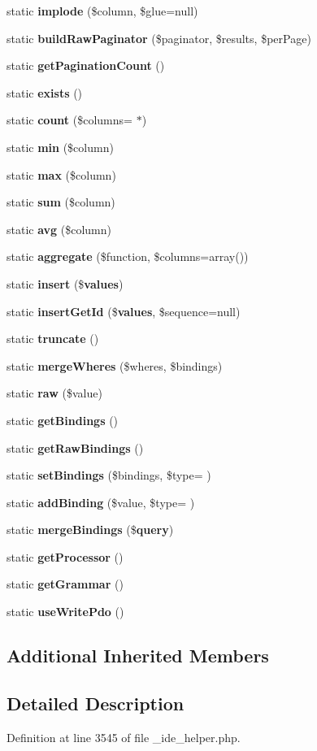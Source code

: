 \begin{DoxyCompactItemize}
static {\bf implode} (\$column, \$glue=null)
\item 
static {\bf build\+Raw\+Paginator} (\$paginator, \$results, \$per\+Page)
\item 
static {\bf get\+Pagination\+Count} ()
\item 
static {\bf exists} ()
\item 
static {\bf count} (\$columns= \textquotesingle{}$\ast$\textquotesingle{})
\item 
static {\bf min} (\$column)
\item 
static {\bf max} (\$column)
\item 
static {\bf sum} (\$column)
\item 
static {\bf avg} (\$column)
\item 
static {\bf aggregate} (\$function, \$columns=array())
\item 
static {\bf insert} (\${\bf values})
\item 
static {\bf insert\+Get\+Id} (\${\bf values}, \$sequence=null)
\item 
static {\bf truncate} ()
\item 
static {\bf merge\+Wheres} (\$wheres, \$bindings)
\item 
static {\bf raw} (\$value)
\item 
static {\bf get\+Bindings} ()
\item 
static {\bf get\+Raw\+Bindings} ()
\item 
static {\bf set\+Bindings} (\$bindings, \$type= \textquotesingle{})
\item 
static {\bf add\+Binding} (\$value, \$type= \textquotesingle{})
\item 
static {\bf merge\+Bindings} (\${\bf query})
\item 
static {\bf get\+Processor} ()
\item 
static {\bf get\+Grammar} ()
\item 
static {\bf use\+Write\+Pdo} ()
\end{DoxyCompactItemize}
\subsection*{Additional Inherited Members}


\subsection{Detailed Description}


Definition at line 3545 of file \+\_\+ide\+\_\+helper.\+php.



